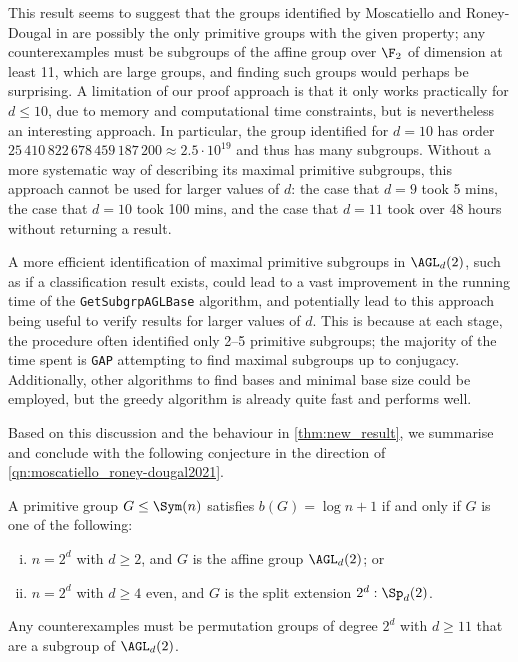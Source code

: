 This result seems to suggest that the groups identified by Moscatiello and Roney-Dougal in \cite{moscatiello_roney-dougal2021} are possibly the only primitive groups with the given property; any counterexamples must be subgroups of the affine group over $\F_2$ of dimension at least 11, which are large groups, and finding such groups would perhaps be surprising. A limitation of our proof approach is that it only works practically for $d \leq 10$, due to memory and computational time constraints, but is nevertheless an interesting approach. In particular, the group identified for $d = 10$ has order $25\,410\,822\,678\,459\,187\,200 \approx 2.5 \cdot 10^{19}$ and thus has many subgroups. Without a more systematic way of describing its maximal primitive subgroups, this approach cannot be used for larger values of $d$: the case that $d = 9$ took 5 mins, the case that $d = 10$ took 100 mins, and the case that $d = 11$ took over 48 hours without returning a result.

A more efficient identification of maximal primitive subgroups in $\AGL_d(2)$, such as if a classification result exists, could lead to a vast improvement in the running time of the \texttt{GetSubgrpAGLBase} algorithm, and potentially lead to this approach being useful to verify results for larger values of $d$. This is because at each stage, the procedure often identified only 2--5 primitive subgroups; the majority of the time spent is \texttt{GAP} attempting to find maximal subgroups up to conjugacy. Additionally, other algorithms to find bases and minimal base size could be employed, but the greedy algorithm is already quite fast and performs well.

Based on this discussion and the behaviour in \autoref{thm:new_result}, we summarise and conclude with the following conjecture in the direction of \autoref{qn:moscatiello_roney-dougal2021}.

\begin{conjecture}\label{conj:new_result}
    A primitive group $G \leq \Sym(n)$ satisfies $b(G) = \log n + 1$ if and only if $G$ is one of the following:
    \begin{enumerate}[(i)]
        \item $n = 2^d$ with $d \geq 2$, and $G$ is the affine group $\AGL_d(2)$; or
        \item $n = 2^d$ with $d \geq 4$ even, and $G$ is the split extension $2^d : \Sp_d(2)$.
    \end{enumerate}
\end{conjecture}

Any counterexamples must be permutation groups of degree $2^d$ with $d \geq 11$ that are a subgroup of $\AGL_d(2)$.